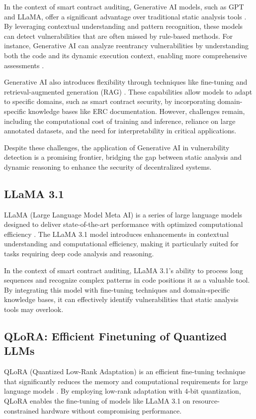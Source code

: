 In the context of smart contract auditing, Generative AI models, such as GPT and LLaMA, offer a significant advantage over traditional static analysis tools \cite{hu2024llm}. By leveraging contextual understanding and pattern recognition, these models can detect vulnerabilities that are often missed by rule-based methods. For instance, Generative AI can analyze reentrancy vulnerabilities by understanding both the code and its dynamic execution context, enabling more comprehensive assessments \cite{chen2023chatgpt}.

Generative AI also introduces flexibility through techniques like fine-tuning and retrieval-augmented generation (RAG) \cite{ding2023parameter, lewis2020rag}. These capabilities allow models to adapt to specific domains, such as smart contract security, by incorporating domain-specific knowledge bases like ERC documentation. However, challenges remain, including the computational cost of training and inference, reliance on large annotated datasets, and the need for interpretability in critical applications.

Despite these challenges, the application of Generative AI in vulnerability detection is a promising frontier, bridging the gap between static analysis and dynamic reasoning to enhance the security of decentralized systems.

\subsection{LLaMA 3.1}
LLaMA (Large Language Model Meta AI) is a series of large language models designed to deliver state-of-the-art performance with optimized computational efficiency \cite{touvron2023llama}. The LLaMA 3.1 model introduces enhancements in contextual understanding and computational efficiency, making it particularly suited for tasks requiring deep code analysis and reasoning.

In the context of smart contract auditing, LLaMA 3.1's ability to process long sequences and recognize complex patterns in code positions it as a valuable tool. By integrating this model with fine-tuning techniques and domain-specific knowledge bases, it can effectively identify vulnerabilities that static analysis tools may overlook.

\subsection{QLoRA: Efficient Finetuning of Quantized LLMs}
QLoRA (Quantized Low-Rank Adaptation) is an efficient fine-tuning technique that significantly reduces the memory and computational requirements for large language models \cite{dettmers2023qlora}. By employing low-rank adaptation with 4-bit quantization, QLoRA enables the fine-tuning of models like LLaMA 3.1 on resource-constrained hardware without compromising performance.

